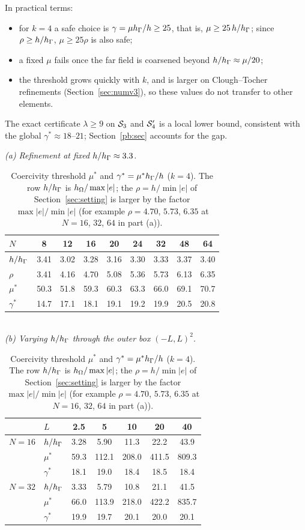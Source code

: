 In practical terms:
\begin{itemize}
\item for $k=4$ a safe choice is $\gamma=\mu h_\Gamma/h\ge25$, that is, $\mu\ge25\,h/h_\Gamma$; since $\rho\ge h/h_\Gamma$, $\mu\ge25\rho$ is also safe;
\item a fixed $\mu$ fails once the far field is coarsened beyond $h/h_\Gamma\approx\mu/20$;
\item the threshold grows quickly with $k$, and is larger on Clough--Tocher refinements (Section~\ref{sec:numv3}), so these values do not transfer to other elements.
\end{itemize}
The exact certificate $\lambda\ge9$ on $\mathcal S_3$ and $\mathcal S_4'$ is a local lower bound, consistent with the global $\gamma^\ast\approx18$--$21$; Section~\ref{pb:sec} accounts for the gap.

\begin{table}[t]
\centering
\caption{Coercivity threshold $\mu^\ast$ and $\gamma^\ast=\mu^\ast h_\Gamma/h$ ($k=4$). The row $h/h_\Gamma$ is $h_\Omega/\max|e|$; the $\rho=h/\min|e|$ of Section~\ref{sec:setting} is larger by the factor $\max|e|/\min|e|$ (for example $\rho=4.70$, $5.73$, $6.35$ at $N=16$, $32$, $64$ in part (a)).}\label{tab:thresh}
\small
\textit{(a) Refinement at fixed $h/h_\Gamma\approx3.3$.}\\[2pt]
\begin{tabular}{lcccccccc}
\toprule
$N$ & 8 & 12 & 16 & 20 & 24 & 32 & 48 & 64\\
\midrule
$h/h_\Gamma$ & 3.41 & 3.02 & 3.28 & 3.16 & 3.30 & 3.33 & 3.37 & 3.40\\
$\rho$ & 3.41 & 4.16 & 4.70 & 5.08 & 5.36 & 5.73 & 6.13 & 6.35\\
$\mu^\ast$ & 50.3 & 51.8 & 59.3 & 60.3 & 63.3 & 66.0 & 69.1 & 70.7\\
$\gamma^\ast$ & 14.7 & 17.1 & 18.1 & 19.1 & 19.2 & 19.9 & 20.5 & 20.8\\
\bottomrule
\end{tabular}\\[6pt]
\textit{(b) Varying $h/h_\Gamma$ through the outer box $(-L,L)^2$.}\\[2pt]
\begin{tabular}{llccccc}
\toprule
 & $L$ & 2.5 & 5 & 10 & 20 & 40\\
\midrule
$N=16$ & $h/h_\Gamma$ & 3.28 & 5.90 & 11.3 & 22.2 & 43.9\\
 & $\mu^\ast$ & 59.3 & 112.1 & 208.0 & 411.5 & 809.3\\
 & $\gamma^\ast$ & 18.1 & 19.0 & 18.4 & 18.5 & 18.4\\
\midrule
$N=32$ & $h/h_\Gamma$ & 3.33 & 5.79 & 10.8 & 21.1 & 41.5\\
 & $\mu^\ast$ & 66.0 & 113.9 & 218.0 & 422.2 & 835.7\\
 & $\gamma^\ast$ & 19.9 & 19.7 & 20.1 & 20.0 & 20.1\\
\bottomrule
\end{tabular}
\end{table}

